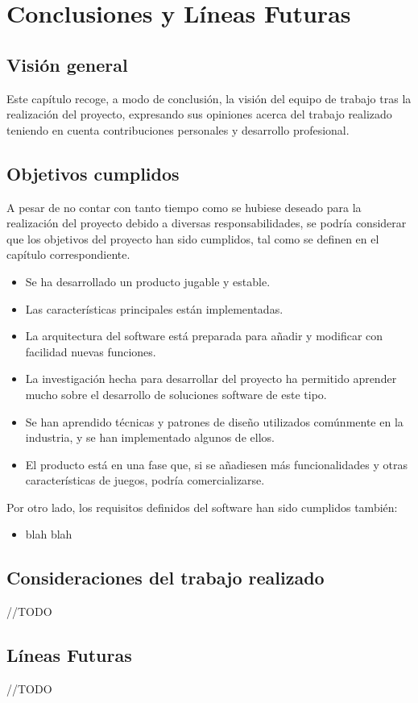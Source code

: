 \chapter{Conclusiones y Líneas Futuras}

\section{Visión general}

	Este capítulo recoge, a modo de conclusión, la visión del equipo de trabajo tras la realización del proyecto, expresando sus opiniones acerca del trabajo realizado teniendo en cuenta contribuciones personales y desarrollo profesional.

\section{Objetivos cumplidos}

	A pesar de no contar con tanto tiempo como se hubiese deseado para la realización del proyecto debido a diversas responsabilidades, se podría considerar que los objetivos del proyecto han sido cumplidos, tal como se definen en el capítulo correspondiente.

	\begin{itemize}

		\item Se ha desarrollado un producto jugable y estable.

		\item Las características principales están implementadas.

		\item La arquitectura del software está preparada para añadir y modificar con facilidad nuevas funciones.

		\item La investigación hecha para desarrollar del proyecto ha permitido aprender mucho sobre el desarrollo de soluciones software de este tipo.

		\item Se han aprendido técnicas y patrones de diseño utilizados comúnmente en la industria, y se han implementado algunos de ellos.

		\item El producto está en una fase que, si se añadiesen más funcionalidades y otras características de juegos, podría comercializarse.

	\end{itemize}

	Por otro lado, los requisitos definidos del software han sido cumplidos también:

	\begin{itemize}

		\item blah blah

	\end{itemize}

\section{Consideraciones del trabajo realizado}

	//TODO

\section{Líneas Futuras}

	//TODO